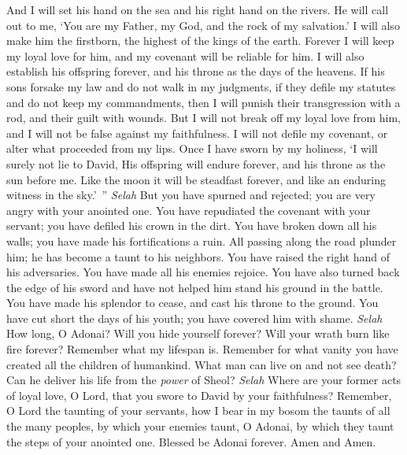 \begin{biblechapter}
\verse And I will set his hand on the sea 
and his right hand on the rivers.
\verse He will call out to me, ‘You are my Father, 
my God, and the rock of my salvation.’
\verse I will also make him the firstborn, 
the highest of the kings of the earth.
\verse Forever I will keep my loyal love for him, 
and my covenant will be reliable for him.
\verse I will also establish his offspring forever, 
and his throne as the days of the heavens.
\verse If his sons forsake my law 
and do not walk in my judgments,
\verse if they defile my statutes 
and do not keep my commandments,
\verse then I will punish their transgression with a rod, 
and their guilt with wounds.
\verse But I will not break off my loyal love from him, 
and I will not be false against my faithfulness.
\verse I will not defile my covenant, 
or alter what proceeded from my lips.
\verse Once I have sworn by my holiness, 
‘I will surely not lie to David,
\verse His offspring will endure forever, 
and his throne as the sun before me.
\verse Like the moon it will be steadfast forever, 
and like an enduring witness in the sky.’ ” \textit{Selah}
\verse But you have spurned and rejected; 
you are very angry with your anointed one.
\verse You have repudiated the covenant with your servant; 
you have defiled his crown in the dirt.
\verse You have broken down all his walls; 
you have made his fortifications a ruin.
\verse All passing along the road plunder him; 
he has become a taunt to his neighbors.
\verse You have raised the right hand of his adversaries. 
You have made all his enemies rejoice.
\verse You have also turned back the edge of his sword 
and have not helped him stand his ground in the battle.
\verse You have made his splendor to cease, 
and cast his throne to the ground.
\verse You have cut short the days of his youth; 
you have covered him with shame. \textit{Selah}
\verse How long, O Adonai? Will you hide yourself forever? 
Will your wrath burn like fire forever?
\verse Remember what my lifespan is. 
Remember for what vanity 
you have created all the children of humankind.
\verse What man can live on and not see death? 
Can he deliver his life from the \textit{power} of Sheol? \textit{Selah}
\verse Where are your former acts of loyal love, O Lord, 
that you swore to David by your faithfulness?
\verse Remember, O Lord the taunting of your servants, 
how I bear in my bosom the taunts of all the many peoples,
\verse by which your enemies taunt, O Adonai, 
by which they taunt the steps of your anointed one.
\verse Blessed be Adonai forever. 
Amen and Amen.
\end{biblechapter}

